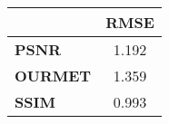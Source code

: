 \begin{tabular}{|l|c|}
\hline
&\textbf{RMSE}\\\hline
\textbf{PSNR}&1.192\\\hline
\textbf{OURMET}&1.359\\\hline
\textbf{SSIM}&0.993\\\hline
\end{tabular}
